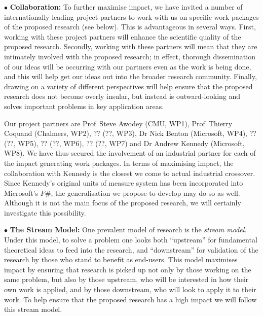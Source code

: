 \documentclass[a4paper,11pt]{article}
\begin{document}

\vspace*{0.02in}

$\bullet$ {\bf Collaboration:} To further maximise impact, we have
invited a number of internationally leading project partners to work
with us on specific work packages of the proposed research (see
below). This is advantageous in several ways. First, working
with these project partners will enhance the scientific
quality of the proposed research. Secondly, working with these
partners will mean that they are intimately involved with the proposed
research; in effect, thorough dissemination of our ideas will be
occurring with our partners even as the work is being done, and this
will %
help get our ideas out into the broader
research community. Finally, drawing on a variety of different
perspectives will help ensure that the proposed research does not
become overly insular, but instead is outward-looking and
solves important problems in key application areas.



Our project partners are Prof~Steve Awodey (CMU, WP1), Prof~Thierry
Coquand (Chalmers, WP2), ?? (??, WP3), Dr Nick Benton (Microsoft,
WP4), ?? (??, WP5), ?? (??, WP6), ?? (??, WP7) and Dr Andrew Kennedy
(Microsoft, WP8). We have thus secured the involvement of an
industrial partner for each of the impact generating work packages.
In terms of maximising impact, the collaboration with Kennedy is
the closest we come to actual industrial crossover. Since Kennedy's
original units of measure system has been incorporated into
Microsoft's $F\#$, the generalisation we propose to develop may do so as
well. Although it is not the main focus of the proposed research, we
will certainly investigate this possibility. 



\vspace*{0.02in}

$\bullet$ {\bf The Stream Model:} One prevalent model of research is
the {\em stream model}. Under this model, to solve a problem one looks
both ``upstream'' for fundamental theoretical ideas to feed into the
research, and ``downstream'' for validation of the research by those
who stand to benefit as end-users. This model maximises impact by
ensuring that research is picked up not only by those working on the
same problem, but also by those upstream, who will be interested in
how their own work is applied, and by those downstream, who will look
to apply it to their work.  To help ensure that the proposed research
has a high impact we will follow this stream model.
\end{document}
